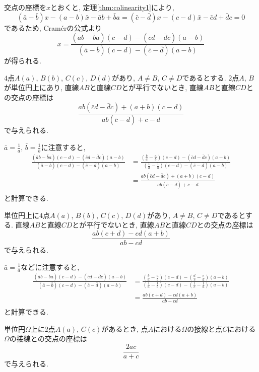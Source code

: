 \begin{prf*}
交点の座標を$x$とおくと, 定理\ref{thm:colinearity1}により,
\[
(\bar{a}-\bar{b})x-(a-b)\bar{x}-\bar{a}b+\bar{b}a=(\bar{c}-\bar{d})x-(c-d)\bar{x}-\bar{c}d+\bar{d}c=0
\]
であるため, Cramérの公式より
\[x=\frac{(\bar{a}b-\bar{b}a)(c-d)-(\bar{c}d-\bar{d}c)(a-b)}{(\bar{a}-\bar{b})(c-d)-(\bar{c}-\bar{d})(a-b)}\]
が得られる.
\end{prf*}
%
\begin{bcor}\label{cor:intersection3}
$4$点$A(a)$, $B(b)$, $C(c)$, $D(d)$があり, $A\neq B$, $C\neq D$であるとする.
$2$点$A$, $B$が単位円上にあり, 直線$AB$と直線$CD$とが平行でないとき, 直線$AB$と直線$CD$との交点の座標は
\[
\frac{ab(\bar{c}d-\bar{d}c)+(a+b)(c-d)}{ab(\bar{c}-\bar{d})+c-d}
\]
で与えられる.
\end{bcor}
\begin{prf*}
$\bar{a}=\frac 1a$, $\bar{b}=\frac 1b$に注意すると,
\begin{align*}
\frac{(\bar{a}b-\bar{b}a)(c-d)-(\bar{c}d-\bar{d}c)(a-b)}{(\bar{a}-\bar{b})(c-d)-(\bar{c}-\bar{d})(a-b)}
&=\frac{(\frac ba-\frac ab)(c-d)-(\bar{c}d-\bar{d}c)(a-b)}{(\frac 1a-\frac 1b)(c-d)-(\bar{c}-\bar{d})(a-b)}\\
&=\frac{ab(\bar{c}d-\bar{d}c)+(a+b)(c-d)}{ab(\bar{c}-\bar{d})+c-d}\\
\end{align*}
と計算できる.
\end{prf*}
%
%
\begin{bcor}\label{cor:intersection2}
単位円上に$4$点$A(a)$, $B(b)$, $C(c)$, $D(d)$があり, $A\neq B$, $C\neq D$であるとする.
直線$AB$と直線$CD$とが平行でないとき, 直線$AB$と直線$CD$との交点の座標は
\[
\frac{ab(c+d)-cd(a+b)}{ab-cd}
\]
で与えられる.
\end{bcor}
\begin{prf*}
$\bar{a}=\frac 1a$などに注意すると,
\begin{align*}
\frac{(\bar{a}b-\bar{b}a)(c-d)-(\bar{c}d-\bar{d}c)(a-b)}{(\bar{a}-\bar{b})(c-d)-(\bar{c}-\bar{d})(a-b)}
&=\frac{(\frac ba-\frac ab)(c-d)-(\frac dc-\frac cd)(a-b)}{(\frac 1a-\frac 1b)(c-d)-(\frac 1c-\frac 1d)(a-b)}\\
&=\frac{ab(c+d)-cd(a+b)}{ab-cd}\\
\end{align*}
と計算できる.
\end{prf*}
%
\begin{bcor}\label{cor:tangents}
単位円$\Omega$上に$2$点$A(a)$, $C(c)$があるとき, 点$A$における$\Omega$の接線と点$C$における$\Omega$の接線との交点の座標は
\[
\frac{2ac}{a+c}
\]
で与えられる.
\end{bcor}
